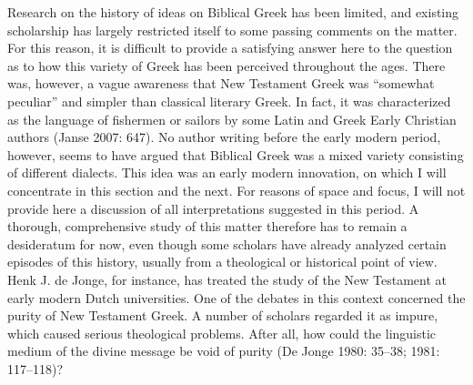 \documentclass[12pt]{article}
\newenvironment{styleStandard}{\renewcommand\baselinestretch{1.25}\setlength\leftskip{0in}\setlength\rightskip{0in}\setlength\parindent{0.1972in}\setlength\parfillskip{0pt plus 1fil}\setlength\parskip{0in plus 1pt}\writerlistparindent\writerlistleftskip\leavevmode\normalfont\normalsize\writerlistlabel\ignorespaces}{\unskip\vspace{0in plus 1pt}\par}
\newcommand\writerlistleftskip{}
\newcommand\writerlistparindent{}
\newcommand\writerlistlabel{}
\begin{document}
\begin{styleStandard}
Research on the history of ideas on Biblical Greek has been limited, and existing scholarship has largely restricted itself to some passing comments on the matter. For this reason, it is difficult to provide a satisfying answer here to the question as to how this variety of Greek has been perceived throughout the ages. There was, however, a vague awareness that New Testament Greek was “somewhat peculiar” and simpler than classical literary Greek. In fact, it was characterized as the language of fishermen or sailors by some Latin and Greek Early Christian authors (Janse 2007: 647). No author writing before the early modern period, however, seems to have argued that Biblical Greek was a mixed variety consisting of different dialects. This idea was an early modern innovation, on which I will concentrate in this section and the next. For reasons of space and focus, I will not provide here a discussion of all interpretations suggested in this period. A thorough, comprehensive study of this matter therefore has to remain a desideratum for now, even though some scholars have already analyzed certain episodes of this history, usually from a theological or historical point of view. Henk J. de Jonge, for instance, has treated the study of the New Testament at early modern Dutch universities. One of the debates in this context concerned the purity of New Testament Greek. A number of scholars regarded it as impure, which caused serious theological problems. After all, how could the linguistic medium of the divine message be void of purity (De Jonge 1980: 35–38; 1981: 117–118)?
\end{styleStandard}
\end{document}
